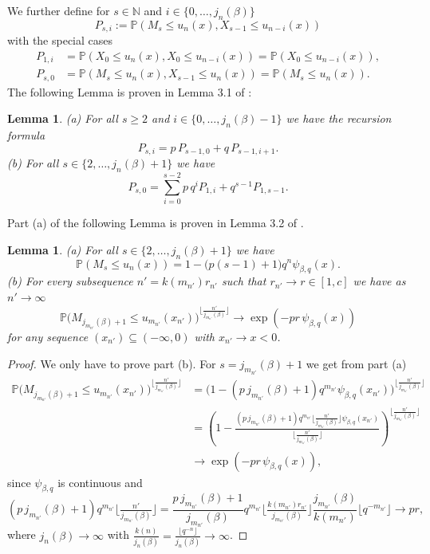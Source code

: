 \documentclass[12pt]{amsart}
\newtheorem{lemma}[theorem]{Lemma}
\theoremstyle{definition}
\theoremstyle{remark}
\newcommand{\nat}{{\mathbb N}}
\newcommand{\Pm}{{\mathbb P}}
\numberwithin{equation}{section}
\begin{document}
We further define for $s\in\nat$ and $i\in\{0,\ldots,j_{n}(\beta)\}$
$$P_{s,i}:=\Pm(M_{s}\leq u_{n}(x), X_{s-1}\leq u_{n-i}(x))$$
with the special cases
\begin{align}
P_{1,i} & =\Pm(X_{0}\leq u_{n}(x), X_{0}\leq u_{n-i}(x))=\Pm(X_{0}\leq u_{n-i}(x)) \label{Pspec1},\\
P_{s,0} & =\Pm(M_{s}\leq u_{n}(x), X_{s-1}\leq u_{n}(x))=\Pm(M_{s}\leq u_{n}(x)) \label{Pspec2}.
\end{align}
The following Lemma is proven in Lemma 3.1 of \cite{Sterk}:

\begin{lemma}\label{Psequations}
{\rm (a)} For all $s\geq2$ and $i\in\{0,\ldots,j_{n}(\beta)-1\}$ we have the recursion formula
$$P_{s,i}=p\,P_{s-1,0}+q\, P_{s-1,i+1}.$$
{\rm (b)} For all $s\in\{2,\ldots,j_{n}(\beta)+1\}$ we have
$$P_{s,0}=\sum_{i=0}^{s-2}p\,q^{i}P_{1,i}+q^{s-1}P_{1,s-1}.$$
\end{lemma}

Part (a) of the following Lemma is proven in Lemma 3.2 of \cite{Sterk}.

\begin{lemma}\label{maxconvmain}
{\rm (a)} For all $s\in\{2,\ldots,j_{n}(\beta)+1\}$ we have
$$\Pm(M_{s}\leq u_{n}(x))=1-\big(p(s-1)+1\big)q^{n}\psi_{\beta,q}(x).$$
{\rm (b)} For every subsequence $n'=k(m_{n'})r_{n'}$ such that $r_{n'}\to r\in[1,c]$ we have as $n'\to\infty$
$$\Pm\big(M_{j_{m_{n'}}(\beta)+1}\leq u_{m_{n'}}(x_{n'})\big)^{\lfloor\frac{n'}{j_{m_{n'}}(\beta)}\rfloor}\to\exp(-pr\,\psi_{\beta,q}(x))$$
for any sequence $(x_{n'})\subseteq(-\infty,0)$ with $x_{n'}\to x<0$.
\end{lemma}

\begin{proof}
We only have to prove part (b). For $s=j_{m_{n'}}(\beta)+1$ we get from part (a)
\begin{align*}
\Pm\big(M_{j_{m_{n'}}(\beta)+1}\leq u_{m_{n'}}(x_{n'})\big)^{\lfloor\frac{n'}{j_{m_{n'}}(\beta)}\rfloor} & =\big(1-(p\,j_{m_{n'}}(\beta)+1)q^{m_{n'}}\psi_{\beta,q}(x_{n'})\big)^{\lfloor\frac{n'}{j_{m_{n'}}(\beta)}\rfloor}\\
& =\left(1-\frac{(p\,j_{m_{n'}}(\beta)+1)q^{m_{n'}}\lfloor\frac{n'}{j_{m_{n'}}(\beta)}\rfloor\psi_{\beta,q}(x_{n'})}{\lfloor\frac{n'}{j_{m_{n'}}(\beta)}\rfloor}\right)^{\lfloor\frac{n'}{j_{m_{n'}}(\beta)}\rfloor}\\
&\to\exp(-pr\,\psi_{\beta,q}(x)),
\end{align*}
since $\psi_{\beta,q}$ is continuous and
$$(p\,j_{m_{n'}}(\beta)+1)q^{m_{n'}}\lfloor\tfrac{n'}{j_{m_{n'}}(\beta)}\rfloor=\frac{p\,j_{m_{n'}}(\beta)+1}{j_{m_{n'}}(\beta)}q^{m_{n'}}\lfloor\tfrac{k(m_{n'})r_{n'}}{j_{m_{n'}}(\beta)}\rfloor\frac{j_{m_{n'}}(\beta)}{k(m_{n'})}\lfloor q^{-m_{n'}}\rfloor\to pr,$$
where $j_{n}(\beta)\to\infty$ with $\frac{k(n)}{j_{n}(\beta)}=\frac{\lfloor q^{-n}\rfloor}{j_{n}(\beta)}\to\infty$.
\end{proof}
\end{document}
